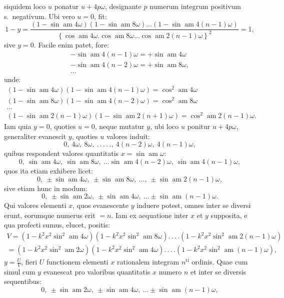 \documentclass{article}
\begin{document}
siquidem loco $u$ ponatur $u+4p\omega$, designante $p$ numerum integrum positivum s.\ negativum. Ubi vero $u=0$, fit:
\[
1-y=\frac{\left(1-\sin\operatorname{am}4\omega\right)\left(1-\sin\operatorname{am}8\omega\right)\ldots\left(1-\sin\operatorname{am}4(n-1)\omega\right)}{\left\{\cos\operatorname{am}4\omega.\cos\operatorname{am}8\omega\ldots\cos\operatorname{am}2(n-1)\omega\right\}^{2}}=1,
\]
sive $y=0$. Facile enim patet, fore:
\[
\begin{gathered}
-\sin\operatorname{am}4(n-1)\omega=+\sin\operatorname{am}4\omega\\
-\sin\operatorname{am}4(n-2)\omega=+\sin\operatorname{am}8\omega,\\
\ldots
\end{gathered}
\]
unde:
\[
\begin{gathered}
\left(1-\sin\operatorname{am}4\omega\right)\left(1-\sin\operatorname{am}4(n-1)\omega\right)=\cos^{2}\operatorname{am}4\omega\\
\left(1-\sin\operatorname{am}8\omega\right)\left(1-\sin\operatorname{am}4(n-2)\omega\right)=\cos^{2}\operatorname{am}8\omega\\
\ldots\\
\left(1-\sin\operatorname{am}2(n-1)\omega\right)\left(1-\sin\operatorname{am}2(n+1)\omega\right)=\cos^{2}\operatorname{am}2(n-1)\omega.
\end{gathered}
\]
Iam quia $y=0$, quoties $u=0$, neque mutatur $y$, ubi loco $u$ ponitur $u+4p\omega$, generaliter evanescit $y$, quoties $u$ valores induit:
\[
0,\ 4\omega,\ 8\omega,\ .\,.\,.\,.\,.,\ 4(n-2)\omega,\ 4(n-1)\omega,
\]
quibus respondent valores quantitatis $x=\sin\operatorname{am}\omega$:
\[
0,\ \sin\operatorname{am}4\omega,\ \sin\operatorname{am}8\omega,\ \ldots\sin\operatorname{am}4(n-2)\omega,\ \sin\operatorname{am}4(n-1)\omega,
\]
quos ita etiam exhibere licet:
\[
0,\ \pm\sin\operatorname{am}4\omega,\ \pm\sin\operatorname{am}8\omega,\ \ldots,\ \pm\sin\operatorname{am}2(n-1)\omega,
\]
sive etiam hunc in modum:
\[
0,\ \pm\sin\operatorname{am}2\omega,\ \pm\sin\operatorname{am}4\omega,\ \ldots\pm\sin\operatorname{am}(n-1)\omega.
\]
Qui valores elementi $x$, quos evanescente $y$ induere potest, omnes inter se diversi erunt, eorumque numerus erit $=n$. Iam ex aequatione inter $x$ et $y$ supposita, e qua profecti sumus, elucet, positis:
\[
\begin{gathered}
V=\left(1-k^{2}x^{2}\sin^{2}\operatorname{am}4\omega\right)\left(1-k^{2}x^{2}\sin^{2}\operatorname{am}8\omega\right).\,.\,.\,.\left(1-k^{2}x^{2}\sin^{2}\operatorname{am}2(n-1)\omega\right)\\[1.5ex]
=\left(1-k^{2}x^{2}\sin^{2}\operatorname{am}2\omega\right)\left(1-k^{2}x^{2}\sin^{2}\operatorname{am}4\omega\right).\,.\,.\,.\left(1-k^{2}x^{2}\sin^{2}\operatorname{am}(n-1)\omega\right),
\end{gathered}
\]
$y=\frac{U}{V}$, fieri $U$ functionem elementi $x$ rationalem integram $n^{\mathrm{ti}}$ ordinis. Quae cum simul cum $y$ evanescat pro valoribus quantitatis $x$ numero $n$ et inter se diversis sequentibus:
\[
0,\ \pm\sin\operatorname{am}2\omega,\ \pm\sin\operatorname{am}4\omega,\ \ldots\pm\sin\operatorname{am}(n-1)\omega,
\]
\end{document}
